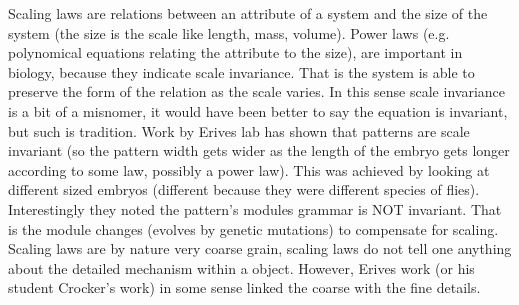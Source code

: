 Scaling laws are relations between an attribute of a system and the size of the system (the size is the scale like length, mass, volume).
Power laws (e.g. polynomical equations relating the attribute to the size), are important in biology, because they indicate scale invariance.  That is the system is able to preserve the form of the relation as the scale varies.  In this sense scale invariance is a bit of a misnomer, it would have been better to say the equation is invariant, but such is tradition.
Work by Erives lab has shown that patterns are scale invariant (so the pattern width gets wider as the length of the embryo gets longer according to some law, possibly a power law).  This was achieved by looking at different sized embryos (different because they were different species of flies).  Interestingly they noted the pattern's modules grammar is NOT invariant.  That is the module changes (evolves by genetic mutations) to compensate for scaling.  Scaling laws are by nature very coarse grain, scaling laws do not tell one anything about the detailed mechanism within a object.  However, Erives work (or his student Crocker's work) in some sense linked the coarse with the fine details.
%
%
%
